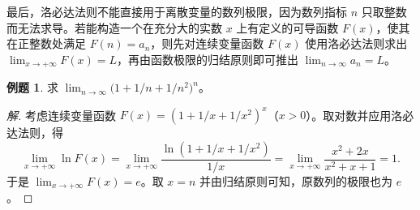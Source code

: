 \documentclass[UTF8,fontset=fandol,a4paper,12pt]{ctexart}
\theoremstyle{definition}
\newtheorem{example}[theorem]{例题}
\begin{document}
最后，洛必达法则不能直接用于离散变量的数列极限，因为数列指标 $n$ 只取整数而无法求导。若能构造一个在充分大的实数 $x$ 上有定义的可导函数 $F(x)$，使其在正整数处满足 $F(n)=a_n$，则先对连续变量函数 $F(x)$ 使用洛必达法则求出 $\lim_{x\to+\infty}F(x)=L$，再由函数极限的归结原则即可推出 $\lim_{n\to\infty}a_n=L$。

\begin{example}
求 $\displaystyle\lim_{n\to\infty}\bigl(1+1/n+1/n^2\bigr)^n$。
\end{example}

\begin{proof}[解]
考虑连续变量函数 $F(x)=(1+1/x+1/x^2)^x$（$x>0$）。取对数并应用洛必达法则，得
\[
 \lim_{x\to+\infty}\ln F(x)
 =\lim_{x\to+\infty}\frac{\ln(1+1/x+1/x^2)}{1/x}
 =\lim_{x\to+\infty}\frac{x^2+2x}{x^2+x+1}=1.
\]
于是 $\lim_{x\to+\infty}F(x)=e$。取 $x=n$ 并由归结原则可知，原数列的极限也为 $e$。
\end{proof}
\end{document}
